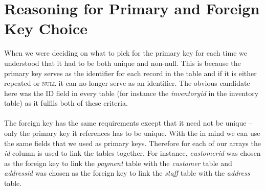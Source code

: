 \documentclass{article}
\begin{document}
\section{Reasoning for Primary and Foreign Key Choice}
	When we were deciding on what to pick for the primary key for each time we understood that it had to be both unique and non-null. 
	This is because the primary key serves as the identifier for each record in the table and if it is either repeated or \textsc{null} it can no longer serve as an identifier. 
	The obvious candidate here was  the ID field in every table (for instance the \emph{inventory\textunderscore id} in the inventory table) as it fulfils both of these criteria.
	\\\\
	The foreign key has the same requirements except that it need not be unique – only the primary key it references has to be unique. 
	With the in mind we can use the same fields that we used as primary keys. Therefore for each of our arrays the \emph{id} column is used to link the tables together. 
	For instance, \emph{customer\textunderscore id} was chosen as the foreign key to link the \emph{payment} table with the \emph{customer} table and \emph{address\textunderscore id} 
	was chosen as the foreign key to link the \emph{staff} table with the \emph{address} table.
\end{document}
